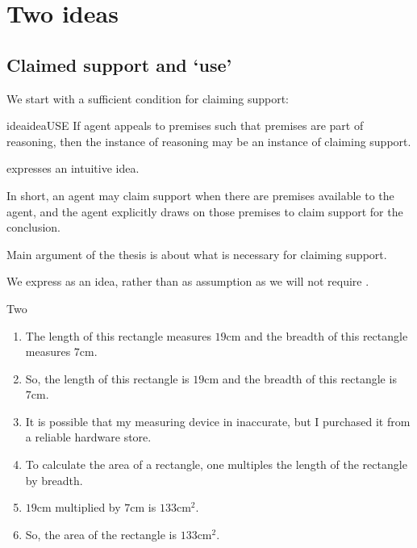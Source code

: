 \chapter{Two ideas}
\label{cha:reasoning-two-ideas}

\section{Claimed support and `use'}
\label{sec:claimed-support-use}

\begin{note}
  We start with a sufficient condition for claiming support:

  \begin{restatable}{idea}{ideaUSE}
    \label{prem:bP}
    \label{prop:USE}
    If agent appeals to premises such that premises are part of reasoning, then the instance of reasoning may be an instance of claiming support.
  \end{restatable}

  \USE{} expresses an intuitive idea.

  In short, an agent may claim support when there are premises available to the agent, and the agent explicitly draws on those premises to claim support for the conclusion.

  Main argument of the thesis is about what is necessary for claiming support.

  We express \USE{} as an idea, rather than as assumption as we will not require \USE{}.
\end{note}

\begin{note}
  Two 
\end{note}

\begin{note}
  \begin{illustration}
    \label{ill:rectangle:basic}
    \mbox{}
    \vspace{-\baselineskip}
    \begin{enumerate}
    \item The length of this rectangle measures \(19\text{cm}\) and the breadth of this rectangle measures \(7\text{cm}\).
    \item So, the length of this rectangle is \(19\text{cm}\) and the breadth of this rectangle is \(7\text{cm}\).
    \item
      It is possible that my measuring device in inaccurate, but I purchased it from a reliable hardware store.
    \item
      To calculate the area of a rectangle, one multiples the length of the rectangle by breadth.
    \item
      \label{ill:rectangle:basic:reasoning}
      \(19\text{cm}\) multiplied by \(7\text{cm}\) is \(133\text{cm}^{2}\).
    \item
      So, the area of the rectangle is \(133\text{cm}^{2}\).
    \end{enumerate}
    \vspace{-\baselineskip}
  \end{illustration}
\end{note}

